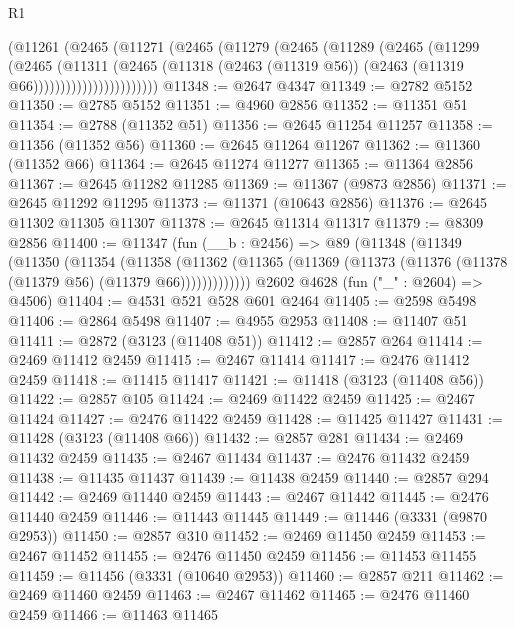 \begin{lexlean}{R1}
\begin{coremodule}
                    (@11261
                      (@2465
                        (@11271
                          (@2465
                            (@11279
                              (@2465
                                (@11289
                                  (@2465
                                    (@11299
                                      (@2465
                                        (@11311
                                          (@2465
                                            (@11318
                                              (@2463 (@11319 @56))
                                              (@2463 (@11319 @66)))))))))))))))))))))))
@11348 := @2647 @4347
@11349 := @2782 @5152
@11350 := @2785 @5152
@11351 := @4960 @2856
@11352 := @11351 @51
@11354 := @2788 (@11352 @51)
@11356 := @2645 @11254 @11257
@11358 := @11356 (@11352 @56)
@11360 := @2645 @11264 @11267
@11362 := @11360 (@11352 @66)
@11364 := @2645 @11274 @11277
@11365 := @11364 @2856
@11367 := @2645 @11282 @11285
@11369 := @11367 (@9873 @2856)
@11371 := @2645 @11292 @11295
@11373 := @11371 (@10643 @2856)
@11376 := @2645 @11302 @11305 @11307
@11378 := @2645 @11314 @11317
@11379 := @8309 @2856
@11400 := @11347
    (fun (__b : @2456) =>
    @89
      (@11348
        (@11349
          (@11350
            (@11354
              (@11358
                (@11362
                  (@11365 (@11369 (@11373 (@11376 (@11378 (@11379 @56) (@11379 @66)))))))))))))
    @2602
    @4628
    (fun ("_" : @2604) => @4506)
@11404 := @4531 @521 @528 @601 @2464
@11405 := @2598 @5498
@11406 := @2864 @5498
@11407 := @4955 @2953
@11408 := @11407 @51
@11411 := @2872 (@3123 (@11408 @51))
@11412 := @2857 @264
@11414 := @2469 @11412 @2459
@11415 := @2467 @11414
@11417 := @2476 @11412 @2459
@11418 := @11415 @11417
@11421 := @11418 (@3123 (@11408 @56))
@11422 := @2857 @105
@11424 := @2469 @11422 @2459
@11425 := @2467 @11424
@11427 := @2476 @11422 @2459
@11428 := @11425 @11427
@11431 := @11428 (@3123 (@11408 @66))
@11432 := @2857 @281
@11434 := @2469 @11432 @2459
@11435 := @2467 @11434
@11437 := @2476 @11432 @2459
@11438 := @11435 @11437
@11439 := @11438 @2459
@11440 := @2857 @294
@11442 := @2469 @11440 @2459
@11443 := @2467 @11442
@11445 := @2476 @11440 @2459
@11446 := @11443 @11445
@11449 := @11446 (@3331 (@9870 @2953))
@11450 := @2857 @310
@11452 := @2469 @11450 @2459
@11453 := @2467 @11452
@11455 := @2476 @11450 @2459
@11456 := @11453 @11455
@11459 := @11456 (@3331 (@10640 @2953))
@11460 := @2857 @211
@11462 := @2469 @11460 @2459
@11463 := @2467 @11462
@11465 := @2476 @11460 @2459
@11466 := @11463 @11465

\end{coremodule}
\end{lexlean}
